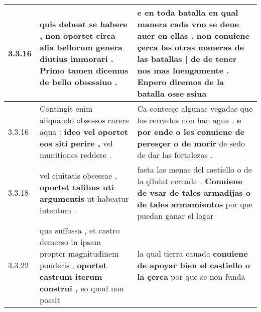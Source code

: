 \begin{tabular}{|p{1cm}|p{6.5cm}|p{6.5cm}|}
3.3.16 & quis debeat se habere , \textbf{ non oportet circa alia bellorum genera diutius immorari . } Primo tamen dicemus de bello obsessiuo . & e en toda batalla en qual manera cada vno se deue auer en ellas . \textbf{ non conuiene çerca las otras maneras de las batallas | de de tener nos mas luengamente . } Enpero diremos de la batalla osse ssiua \\\hline
3.3.16 & Contingit enim aliquando obsessos carere aqua : \textbf{ ideo vel oportet eos siti perire , } vel munitiones reddere . & Ca contesçe algunas vegadas que los cercados non han agua . \textbf{ e por ende o les conuiene de peresçer o de morir } de sedo de dar las fortalezas . \\\hline
3.3.18 & vel ciuitatis obsessae , \textbf{ oportet talibus uti argumentis } ut habeatur intentum . & fasta las menas del castiello o de la çibdat cercada . \textbf{ Conuiene de vsar de tales armadijas o de tales armamientos } por que puedan ganar el logar \\\hline
3.3.22 & qua suffossa , et castro demerso in ipsam propter magnitudinem ponderis , \textbf{ oportet castrum iterum construi , } eo quod non possit & la qual tierra cauada \textbf{ conuiene de apoyar bien el castiello o la çerca } por que se non funda \\\hline

\end{tabular}
